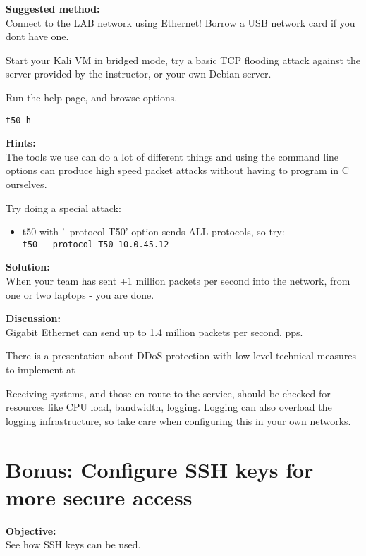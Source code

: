 \documentclass[a4paper,11pt,notitlepage]{report}
\begin{document}
{\bf Suggested method:}\\
Connect to the LAB network using Ethernet! Borrow a USB network card if you dont have one.

Start your Kali VM in bridged mode, try a basic TCP flooding attack against the server provided by the instructor, or your own Debian server.

Run the help page, and browse options.
\begin{alltt}\footnotesize
t50 -h
\end{alltt}





{\bf Hints:}\\
The tools we use can do a lot of different things and using the command line options can produce high speed packet attacks without having to program in C ourselves.

Try doing a special attack:
\begin{itemize}
\item t50 with '--protocol T50' option sends ALL protocols, so try:\\
\verb+t50 --protocol T50 10.0.45.12+
\end{itemize}


{\bf Solution:}\\
When your team has sent +1 million packets per second into the network, from one or two laptops - you are done.

{\bf Discussion:}\\
Gigabit Ethernet can send up to 1.4 million packets per second, pps.

There is a presentation about DDoS protection with low level technical measures to implement at\\
{\footnotesize {}}

Receiving systems, and those en route to the service, should be checked for resources like CPU load, bandwidth, logging. Logging can also overload the logging infrastructure, so take care when configuring this in your own networks.



\chapter{Bonus: Configure SSH keys for more secure access}
\label{ex:config-ssh-keys}

{\bf Objective:}\\
See how SSH keys can be used.
\end{document}
